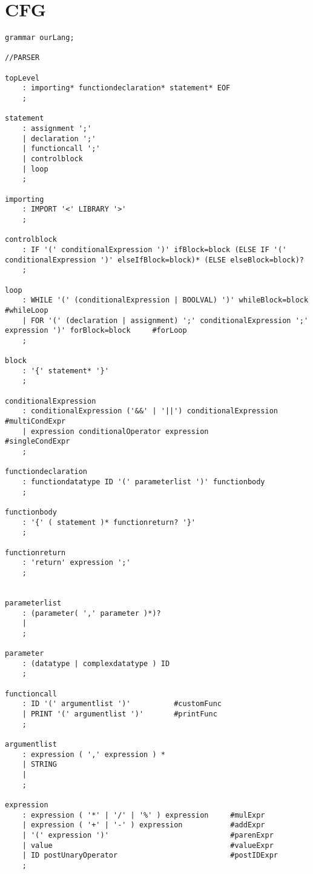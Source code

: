 \chapter{CFG}\label{app:CFG}
\begin{lstlisting}[caption={\acrshort{cfg} and Lexing rules},frame=tlrb,numbers=none]
grammar ourLang;

//PARSER

topLevel
    : importing* functiondeclaration* statement* EOF
    ;

statement
    : assignment ';'
    | declaration ';'
    | functioncall ';'
    | controlblock
    | loop
    ;

importing
    : IMPORT '<' LIBRARY '>'
    ; 

controlblock
    : IF '(' conditionalExpression ')' ifBlock=block (ELSE IF '(' conditionalExpression ')' elseIfBlock=block)* (ELSE elseBlock=block)?
    ;

loop
    : WHILE '(' (conditionalExpression | BOOLVAL) ')' whileBlock=block      #whileLoop
    | FOR '(' (declaration | assignment) ';' conditionalExpression ';' expression ')' forBlock=block     #forLoop
    ;

block
    : '{' statement* '}'
    ;
    
conditionalExpression
    : conditionalExpression ('&&' | '||') conditionalExpression  #multiCondExpr
    | expression conditionalOperator expression                  #singleCondExpr
    ;

functiondeclaration
    : functiondatatype ID '(' parameterlist ')' functionbody
    ; 
    
functionbody
    : '{' ( statement )* functionreturn? '}'
    ;

functionreturn
    : 'return' expression ';'
    ;


parameterlist
    : (parameter( ',' parameter )*)?
    | 
    ;

parameter
    : (datatype | complexdatatype ) ID
    ;

functioncall
    : ID '(' argumentlist ')'          #customFunc
    | PRINT '(' argumentlist ')'       #printFunc
    ;

argumentlist
    : expression ( ',' expression ) *
    | STRING
    | 
    ;

expression
    : expression ( '*' | '/' | '%' ) expression     #mulExpr
    | expression ( '+' | '-' ) expression           #addExpr
    | '(' expression ')'                            #parenExpr
    | value                                         #valueExpr
    | ID postUnaryOperator                          #postIDExpr
    ;


\end{lstlisting}
